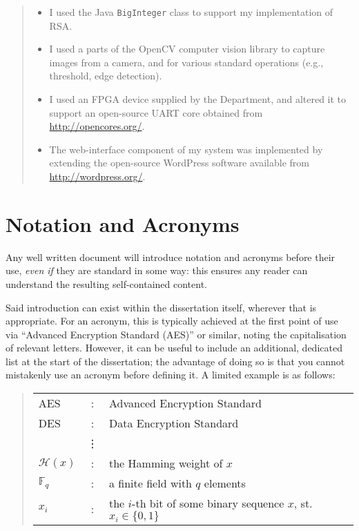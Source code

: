 \documentclass[ %
                    author={Lucas O'Dowd-Jones},
                supervisor={Dr. Alex Kavvos},
                    degree={MEng},
                     title={Variations on Normalisation by Evaluation in Haskell},
                  subtitle={},
                      type={programming languages},
                      year={2021}]{dissertation}
\begin{document}
\begin{quote}
\noindent
\begin{itemize}
\item I used the Java {\tt BigInteger} class to support my implementation 
      of RSA.
\item I used a parts of the OpenCV computer vision library to capture 
      images from a camera, and for various standard operations (e.g., 
      threshold, edge detection).
\item I used an FPGA device supplied by the Department, and altered it 
      to support an open-source UART core obtained from 
      \url{http://opencores.org/}.
\item The web-interface component of my system was implemented by 
      extending the open-source WordPress software available from
      \url{http://wordpress.org/}.
\end{itemize}
\end{quote}


\chapter*{Notation and Acronyms}


\noindent
Any well written document will introduce notation and acronyms before
their use, {\em even if} they are standard in some way: this ensures 
any reader can understand the resulting self-contained content.  

Said introduction can exist within the dissertation itself, wherever 
that is appropriate.  For an acronym, this is typically achieved at 
the first point of use via ``Advanced Encryption Standard (AES)'' or 
similar, noting the capitalisation of relevant letters.  However, it 
can be useful to include an additional, dedicated list at the start 
of the dissertation; the advantage of doing so is that you cannot 
mistakenly use an acronym before defining it.  A limited example is 
as follows:

\begin{quote}
\noindent
\begin{tabular}{lcl}
AES                 &:     & Advanced Encryption Standard                                         \\
DES                 &:     & Data Encryption Standard                                             \\
                    &\vdots&                                                                      \\
${\mathcal H}( x )$ &:     & the Hamming weight of $x$                                            \\
${\mathbb  F}_q$    &:     & a finite field with $q$ elements                                     \\
$x_i$               &:     & the $i$-th bit of some binary sequence $x$, st. $x_i \in \{ 0, 1 \}$ \\
\end{tabular}
\end{quote}
\end{document}
